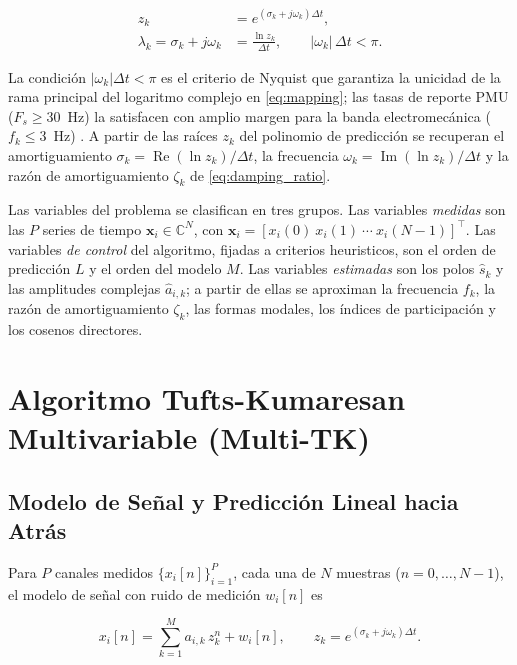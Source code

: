 \begin{align}
    z_k &= e^{(\sigma_k + j\omega_k)\Delta t}, \\[4pt]
    \lambda_k = \sigma_k + j\omega_k &= \frac{\ln z_k}{\Delta t},
    \qquad |\omega_k|\,\Delta t < \pi .
    \label{eq:mapping}
\end{align}

La condición $|\omega_k|\Delta t < \pi$ es el criterio de Nyquist que
garantiza la unicidad de la rama principal del logaritmo complejo en
\eqref{eq:mapping}; las tasas de reporte PMU ($F_s \ge 30$~Hz) la
satisfacen con amplio margen para la banda electromecánica
($f_k \le 3$~Hz) \cite{sauer2017}. A partir de las raíces $z_k$ del
polinomio de predicción se recuperan el amortiguamiento
$\sigma_k = \operatorname{Re}(\ln z_k)/\Delta t$, la frecuencia
$\omega_k = \operatorname{Im}(\ln z_k)/\Delta t$ y la razón de
amortiguamiento $\zeta_k$ de \eqref{eq:damping_ratio}.

Las variables del problema se clasifican en tres grupos. Las variables 
\textit{medidas} son las $P$ series de tiempo $\mathbf{x}_i \in \mathbb{C}^{N}$, 
con $\mathbf{x}_i = [x_i(0)\ x_i(1)\ \cdots\ x_i(N-1)]^{\top}$. Las variables 
\textit{de control} del algoritmo, fijadas a criterios heuristicos, son el orden 
de predicción $L$ y el orden del modelo $M$. Las variables \textit{estimadas} 
son los polos $\hat{s}_k$ y las amplitudes complejas $\hat{a}_{i,k}$; a partir 
de ellas se aproximan la frecuencia $f_k$, la razón de amortiguamiento 
$\zeta_k$, las formas modales, los índices de participación y los cosenos directores.

\section{Algoritmo Tufts-Kumaresan Multivariable (Multi-TK)}

\subsection{Modelo de Señal y Predicción Lineal hacia Atrás}

Para $P$ canales medidos $\{x_i[n]\}_{i=1}^P$, cada una de $N$ muestras ($n=0,\dots,N-1$), 
el modelo de señal con ruido de medición $w_i[n]$ es

\begin{equation}
x_i[n] = \sum_{k=1}^{M} a_{i,k}\, z_k^n + w_i[n], \qquad z_k = e^{(\sigma_k + j\omega_k)\Delta t}.
\label{eq:signal_model}
\end{equation}

